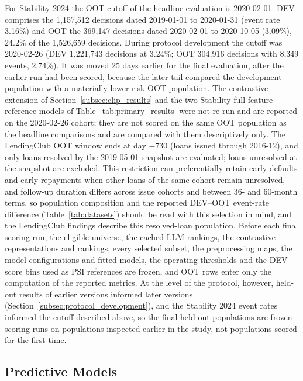 \documentclass[final,5p,twocolumn]{elsarticle}
\begin{document}
For Stability 2024 the OOT cutoff of the headline evaluation is 2020-02-01: DEV comprises the 1,157,512 decisions dated 2019-01-01 to 2020-01-31 (event rate 3.16\%) and OOT the 369,147 decisions dated 2020-02-01 to 2020-10-05 (3.09\%), 24.2\% of the 1,526,659 decisions. During protocol development the cutoff was 2020-02-26 (DEV 1,221,743 decisions at 3.24\%; OOT 304,916 decisions with 8,349 events, 2.74\%). It was moved 25 days earlier for the final evaluation, after the earlier run had been scored, because the later tail compared the development population with a materially lower-risk OOT population. The contrastive extension of Section~\ref{subsec:clip_results} and the two Stability full-feature reference models of Table~\ref{tab:primary_results} were not re-run and are reported on the 2020-02-26 cohort; they are not scored on the same OOT population as the headline comparisons and are compared with them descriptively only. The LendingClub OOT window ends at day $-730$ (loans issued through 2016-12), and only loans resolved by the 2019-05-01 snapshot are evaluated; loans unresolved at the snapshot are excluded. This restriction can preferentially retain early defaults and early repayments when other loans of the same cohort remain unresolved, and follow-up duration differs across issue cohorts and between 36- and 60-month terms, so population composition and the reported DEV--OOT event-rate difference (Table~\ref{tab:datasets}) should be read with this selection in mind, and the LendingClub findings describe this resolved-loan population. Before each final scoring run, the eligible universe, the cached LLM rankings, the contrastive representations and rankings, every selected subset, the preprocessing maps, the model configurations and fitted models, the operating thresholds and the DEV score bins used as PSI references are frozen, and OOT rows enter only the computation of the reported metrics. At the level of the protocol, however, held-out results of earlier versions informed later versions (Section~\ref{subsec:protocol_development}), and the Stability 2024 event rates informed the cutoff described above, so the final held-out populations are frozen scoring runs on populations inspected earlier in the study, not populations scored for the first time.

\subsection{Predictive Models}
\label{subsec:models}
\end{document}
